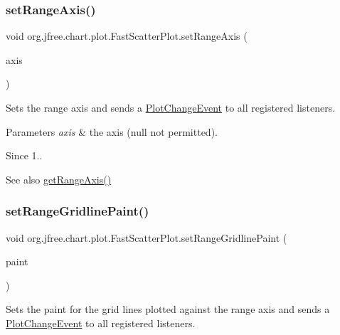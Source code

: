 \subsubsection{\texorpdfstring{set\+Range\+Axis()}{setRangeAxis()}}
{\footnotesize\ttfamily void org.\+jfree.\+chart.\+plot.\+Fast\+Scatter\+Plot.\+set\+Range\+Axis (\begin{DoxyParamCaption}\item[{\mbox{\hyperlink{classorg_1_1jfree_1_1chart_1_1axis_1_1_value_axis}{Value\+Axis}}}]{axis }\end{DoxyParamCaption})}

Sets the range axis and sends a \mbox{\hyperlink{}{Plot\+Change\+Event}} to all registered listeners.


\begin{DoxyParams}{Parameters}
{\em axis} & the axis ({\ttfamily null} not permitted).\\
\hline
\end{DoxyParams}
\begin{DoxySince}{Since}
1..
\end{DoxySince}
\begin{DoxySeeAlso}{See also}
\mbox{\hyperlink{classorg_1_1jfree_1_1chart_1_1plot_1_1_fast_scatter_plot_ad202f880b34e883d591b154e943177d0}{get\+Range\+Axis()}} 
\end{DoxySeeAlso}
\mbox{\label{classorg_1_1jfree_1_1chart_1_1plot_1_1_fast_scatter_plot_ac05c849d6e0f0e6b35a2f7e8ba0d8d43}} 
\subsubsection{\texorpdfstring{set\+Range\+Gridline\+Paint()}{setRangeGridlinePaint()}}
{\footnotesize\ttfamily void org.\+jfree.\+chart.\+plot.\+Fast\+Scatter\+Plot.\+set\+Range\+Gridline\+Paint (\begin{DoxyParamCaption}\item[{Paint}]{paint }\end{DoxyParamCaption})}

Sets the paint for the grid lines plotted against the range axis and sends a \mbox{\hyperlink{}{Plot\+Change\+Event}} to all registered listeners.


